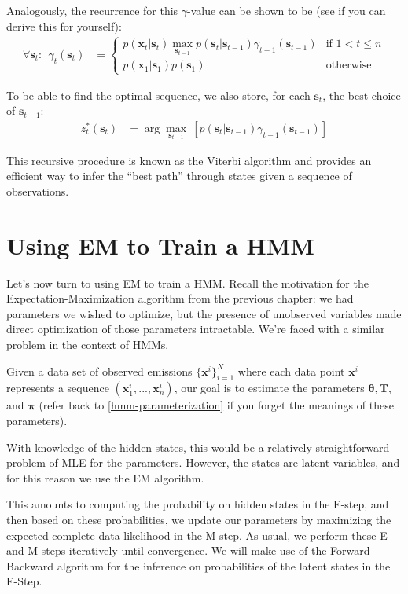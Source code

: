 Analogously, the recurrence for this $\gamma$-value can be shown to be (see if you can derive this for yourself):
%
\begin{align}
\forall \textbf{s}_t:\ \ 
\gamma_t(\textbf{s}_t)&=\left\{
\begin{array}{ll}
p(\textbf{x}_t| \textbf{s}_t)\max_{\textbf{s}_{t-1}} p(\textbf{s}_t|\textbf{s}_{t-1})\gamma_{t-1}(\textbf{s}_{t-1}) &\mbox{if $1<t\leq n$}\\
p(\textbf{x}_1| \textbf{s}_1)p(\textbf{s}_1) &\mbox{otherwise}
\end{array}
\right.
\end{align}

To be able to find the optimal sequence, we also
 store, for each $\textbf{s}_t$, the best choice of $\textbf{s}_{t-1}$:
\begin{align}
z^*_t(\textbf{s}_t)&=
\arg\max_{\textbf{s}_{t-1}}\ [p(\textbf{s}_t| \textbf{s}_{t-1})\gamma_{t-1}(\textbf{s}_{t-1})]
\end{align}

This recursive procedure is known as the Viterbi algorithm and provides an efficient way to infer the ``best path'' through states given a sequence of observations.


\section{Using EM to Train a HMM}
\label{sec:hmmEM}

Let's now turn to  using EM to train a HMM.
%
Recall the motivation for the Expectation-Maximization algorithm from the previous chapter: we had parameters we wished to optimize, but the presence of unobserved variables made direct optimization of those parameters intractable. We're faced with a similar problem in the context of HMMs.


Given a data set of observed emissions $\{ \textbf{x}^{i} \}_{i=1}^{N}$ where each data point $\textbf{x}^{i}$ represents a sequence $(\textbf{x}_{1}^{i}, ..., \textbf{x}_{n}^{i})$, our goal is to estimate the parameters $\boldsymbol{\theta}, \textbf{T}$, and $\boldsymbol{\pi}$ (refer back to \ref{hmm-parameterization} if you forget the meanings of these parameters).

With knowledge of the hidden states, this would be a relatively straightforward problem of MLE for the parameters. 
%
However, the states are latent variables, and for this reason we use the EM
algorithm.

This amounts to computing the probability on hidden states in the E-step, and then based on these probabilities, we update our parameters by maximizing the expected complete-data likelihood in the M-step. As usual, we perform these E and M steps iteratively until convergence.  We will make use of the Forward-Backward algorithm for the inference on probabilities of the latent states in the E-Step.

